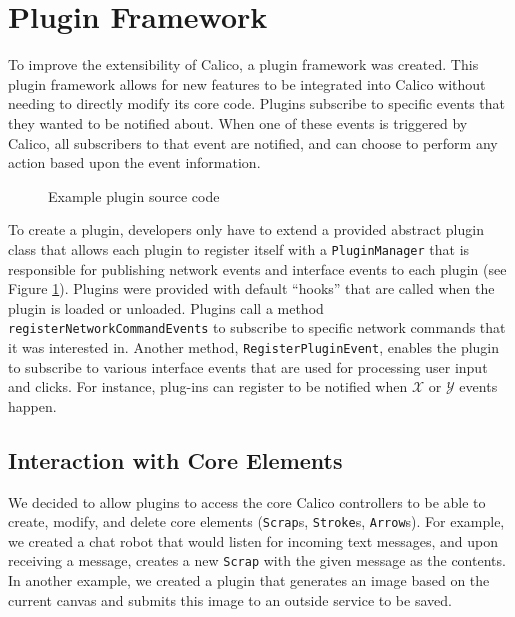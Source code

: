 \section{Plugin Framework}
To improve the extensibility of Calico, a plugin framework was created. This plugin framework allows for new features to be integrated into Calico without needing to directly modify its core code. Plugins subscribe to specific events that they wanted to be notified about. When one of these events is triggered by Calico, all subscribers to that event are notified, and can choose to perform any action based upon the event information. 

\begin{figure}[h!]
  \centering
  \small
  
  \normalsize
  \caption{Example plugin source code}
  \label{code:plugin_file}
\end{figure}

To create a plugin, developers only have to extend a provided abstract plugin class that allows each plugin to register itself with a \texttt{PluginManager} that is responsible for publishing network events and interface events to each plugin (see Figure \ref{code:plugin_file}). Plugins were provided with default ``hooks'' that are called when the plugin is loaded or unloaded. Plugins call a method \texttt{registerNetworkCommandEvents} to subscribe to specific network commands that it was interested in. Another method, \texttt{RegisterPluginEvent}, enables the plugin to subscribe to various interface events that are used for processing user input and clicks. For instance, plug-ins can register to be notified when $\mathcal{X}$ or $\mathcal{Y}$ events happen.

\subsection*{Interaction with Core Elements}
We decided to allow plugins to access the core Calico controllers to be able to create, modify, and delete core elements (\texttt{Scrap}s, \texttt{Stroke}s, \texttt{Arrow}s). For example, we created a chat robot that would listen for incoming text messages, and upon receiving a message, creates a new \texttt{Scrap} with the given message as the contents. In another example, we created a plugin that generates an image based on the current canvas and submits this image to an outside service to be saved.

